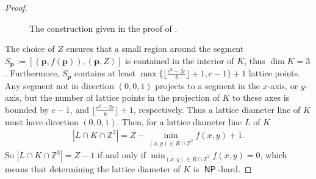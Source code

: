 \documentclass[11pt]{article}
\newcommand{\bp}{\mathbf{p}}
\newcommand{\Z}{\mathbb{Z}}
\DeclareMathOperator{\NP}{\mathsf{NP}} %
\begin{document}
\begin{proof}
\begin{figure}[h!]
\caption{The construction given in the proof of .}
\label{fig:NP-hard-graph}
\end{figure}
     
The choice of $Z$ ensures that a small region around the segment $S_\bp:=[(\bp,f(\bp)),(\bp,Z)]$ is contained in the interior of $K$, thus $\dim K =3$.
Furthermore, $S_\bp$ contains at least $\max\{ \lfloor\frac{c^2-2c}{b}\rfloor +1,c-1\} +1$ lattice points. Any segment not in direction $(0,0,1)$ projects to a segment in the $x$-axis, or $y$-axis, but the number of lattice points in the projection of $K$ to these axes is bounded by $c-1$, and $\lfloor \frac{c^2-2c}{b}\rfloor +1$, respectively. Thus a lattice diameter line of $K$ must have direction $(0,0,1)$. Then, for a lattice diameter line $L$ of $K$
\begin{align*}
         |L \cap K \cap \Z^3| = Z-\min_{(x,y) \in R \cap \Z^2}f(x,y) +1.
     \end{align*}
So $|L \cap K \cap \Z^3|=Z-1$ if and only if $\min_{(x,y)\in R \cap \Z^2} f(x,y)=0$, which means that determining the lattice diameter of $K$ is $\NP$-hard.


\end{proof}
\end{document}
